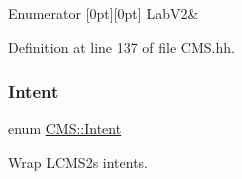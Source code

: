 \begin{DoxyEnumFields}{Enumerator}
[0pt][0pt]{}\mbox{\label{namespace_c_m_s_a9cb18b5da51a22c3c9dd25a5c9048e42adcfa436ea7af1a1cfba7e2b925dffea4}} 
Lab\+V2&\\
\hline

\end{DoxyEnumFields}


Definition at line 137 of file C\+M\+S.\+hh.

\mbox{\label{namespace_c_m_s_aabe6afbe3c2cd6188befc3096f1ea069}} 
\subsubsection{\texorpdfstring{Intent}{Intent}}
{\footnotesize\ttfamily enum \hyperlink{namespace_c_m_s_aabe6afbe3c2cd6188befc3096f1ea069}{C\+M\+S\+::\+Intent}\hspace{0.3cm}{\ttfamily [strong]}}



Wrap L\+C\+M\+S2\textquotesingle{}s intents. 

